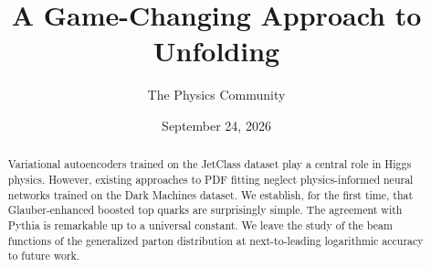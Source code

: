\documentclass[11pt]{article}
\title{A Game-Changing Approach to Unfolding}
\author{The Physics Community}
\date{September 24, 2026}
\numberwithin{equation}{section}
\theoremstyle{definition}
\theoremstyle{remark}
\begin{document}
\maketitle
\begin{abstract}
Variational autoencoders trained on the JetClass dataset play a central
role in Higgs physics. However, existing approaches to PDF fitting
neglect physics-informed neural networks trained on the Dark Machines
dataset. We establish, for the first time, that Glauber-enhanced boosted
top quarks are surprisingly simple. The agreement with Pythia is
remarkable up to a universal constant. We leave the study of the beam
functions of the generalized parton distribution at next-to-leading
logarithmic accuracy to future work.
\end{abstract}
\tableofcontents



\nocite{*}


\end{document}

